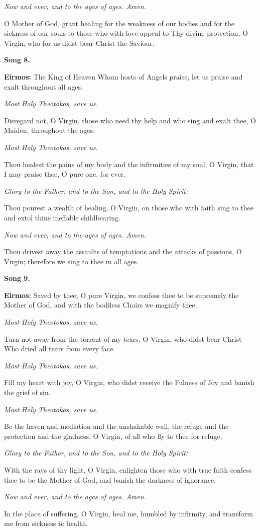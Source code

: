 \emph{Now and ever, and to the ages of ages. Amen.}

O Mother of God, grant healing for the weakness of our bodies and for the sickness of our souls to those who with love appeal to Thy divine protection, O Virgin, who for us didst bear Christ the Saviour.

\textbf{Song 8.}

\textbf{Eirmos:} 
The King of Heaven Whom hosts of Angels praise, let us praise and exalt throughout all ages.

\emph{Most Holy Theotokos, save us.}

Disregard not, O Virgin, those who need thy help and who sing and exalt thee, O Maiden, throughout the ages.

\emph{Most Holy Theotokos, save us.}

Thou healest the pains of my body and the infirmities of my soul, O Virgin, that I may praise thee, O pure one, for ever.

\emph{Glory to the Father, and to the Son, and to the Holy Spirit:}

Thou pourest a wealth of healing, O Virgin, on those who with faith sing to thee and extol thine ineffable childbearing.

\emph{Now and ever, and to the ages of ages. Amen.}

Thou drivest away the assaults of temptations and the attacks of passions, O Virgin; 
therefore we sing to thee in all ages.

\textbf{Song 9.}

\textbf{Eirmos:} 
Saved by thee, O pure Virgin, we confess thee to be supremely the Mother of God, and with the bodiless Choirs we magnify thee.

\emph{Most Holy Theotokos, save us.}

Turn not away from the torrent of my tears, O Virgin, who didst bear Christ Who dried all tears from every face.

\emph{Most Holy Theotokos, save us.}

Fill my heart with joy, O Virgin, who didst receive the Fulness of Joy and banish the grief of sin.

\emph{Most Holy Theotokos, save us.}

Be the haven and mediation and the unshakable wall, the refuge and the protection and the gladness, O Virgin, of all who fly to thee for refuge.

\emph{Glory to the Father, and to the Son, and to the Holy Spirit:}

With the rays of thy light, O Virgin, enlighten those who with true faith confess thee to be the Mother of God, and banish the darkness of ignorance.

\emph{Now and ever, and to the ages of ages. Amen.}

In the place of suffering, O Virgin, heal me, humbled by infirmity, and transform me from sickness to health.

